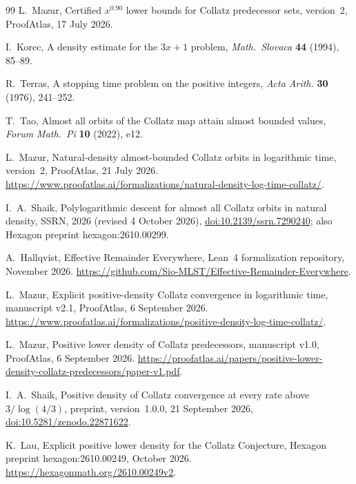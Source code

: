 \documentclass[11pt,reqno,oneside]{amsart}
\begin{document}
{\begin{thebibliography}{99}
L.~Mazur, Certified $x^{0.90}$ lower bounds for Collatz predecessor sets, version~2, ProofAtlas, 17 July 2026.

I.~Korec, A density estimate for the $3x+1$ problem, \emph{Math.\ Slovaca} \textbf{44} (1994), 85--89.

R.~Terras, A stopping time problem on the positive integers, \emph{Acta Arith.} \textbf{30} (1976), 241--252.

T.~Tao, Almost all orbits of the Collatz map attain almost bounded values, \emph{Forum Math.\ Pi} \textbf{10} (2022), e12.

L.~Mazur, Natural-density almost-bounded Collatz orbits in logarithmic time, version~2, ProofAtlas, 21 July 2026. \url{https://www.proofatlas.ai/formalizations/natural-density-log-time-collatz/}.

I.~A.~Shaik, Polylogarithmic descent for almost all Collatz orbits in natural density, SSRN, 2026 (revised 4 October 2026), \href{https://doi.org/10.2139/ssrn.7290240}{doi:10.2139/ssrn.7290240}; also Hexagon preprint hexagon:2610.00299.

A.~Hallqvist, Effective Remainder Everywhere, Lean~4 formalization repository, November 2026. \url{https://github.com/Sio-MLST/Effective-Remainder-Everywhere}.

L.~Mazur, Explicit positive-density Collatz convergence in logarithmic time, manuscript v2.1, ProofAtlas, 6 September 2026. \url{https://www.proofatlas.ai/formalizations/positive-density-log-time-collatz/}.

L.~Mazur, Positive lower density of Collatz predecessors, manuscript v1.0, ProofAtlas, 6 September 2026. \url{https://proofatlas.ai/papers/positive-lower-density-collatz-predecessors/paper-v1.pdf}.

I.~A.~Shaik, Positive density of Collatz convergence at every rate above $3/\log(4/3)$, preprint, version~1.0.0, 21 September 2026, \href{https://doi.org/10.5281/zenodo.22871622}{doi:10.5281/zenodo.22871622}.

K.~Lau, Explicit positive lower density for the Collatz Conjecture, Hexagon preprint hexagon:2610.00249, October 2026. \url{https://hexagonmath.org/2610.00249v2}.

\end{thebibliography}}
\end{document}
